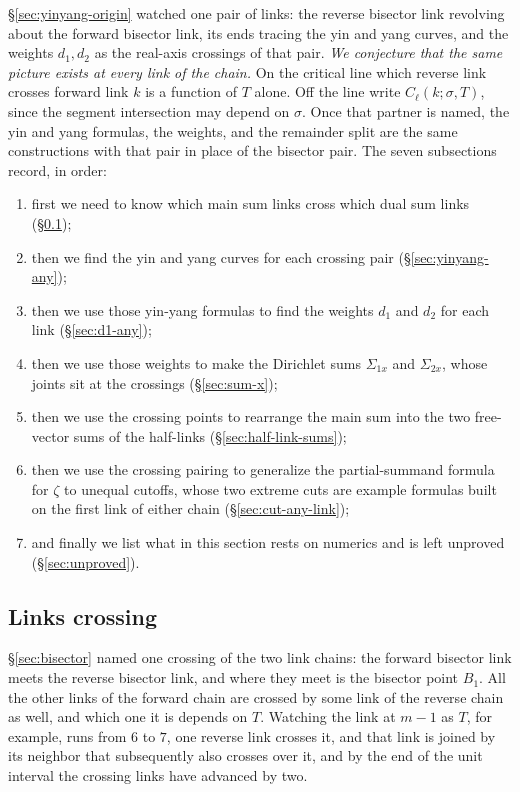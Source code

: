 \documentclass[11pt]{article}
\theoremstyle{definition}
\begin{document}
\S\ref{sec:yinyang-origin} watched one pair of links: the reverse bisector link revolving
about the forward bisector link, its ends tracing the yin and yang curves, and
the weights $d_1,d_2$ as the real-axis crossings of that pair. \emph{We
conjecture that the same picture exists at every link of the chain.} On the
critical line which reverse link crosses forward link $k$ is a function of
$T$ alone. Off the line write $C_{\ell}(k;\sigma,T)$, since the segment
intersection may depend on $\sigma$. Once that partner is named, the yin and yang
formulas, the weights, and the remainder split are the same constructions with
that pair in place of the bisector pair. The seven subsections record, in order:
\begin{enumerate}
\item first we need to know which main sum links cross which dual sum links
(\S\ref{sec:links-crossing});
\item then we find the yin and yang curves for each crossing pair
(\S\ref{sec:yinyang-any});
\item then we use those yin-yang formulas to find the weights $d_1$ and
$d_2$ for each link (\S\ref{sec:d1-any});
\item then we use those weights to make the Dirichlet sums $\Sigma_{1x}$
and $\Sigma_{2x}$, whose joints sit at the crossings (\S\ref{sec:sum-x});
\item then we use the crossing points to rearrange the main sum into the
two free-vector sums of the half-links (\S\ref{sec:half-link-sums});
\item then we use the crossing pairing to generalize the partial-summand
formula for $\zeta$ to unequal cutoffs, whose two extreme cuts are example
formulas built on the first link of either chain
(\S\ref{sec:cut-any-link});
\item and finally we list what in this section rests on numerics and is
left unproved (\S\ref{sec:unproved}).
\end{enumerate}

\subsection{Links crossing}\label{sec:links-crossing}

\S\ref{sec:bisector} named one crossing of the two link chains: the forward
bisector link meets the reverse bisector link, and where they meet is the
bisector point $B_1$. All the other links of the forward chain are crossed by some
link of the reverse chain as well, and which one it is depends on $T$. Watching
the link at $m-1$ as $T$, for example, runs from $6$ to $7$, one reverse link
crosses it, and that link is joined by its neighbor that subsequently also
crosses over it, and by the end of the unit interval the crossing links have
advanced by two.
\end{document}
